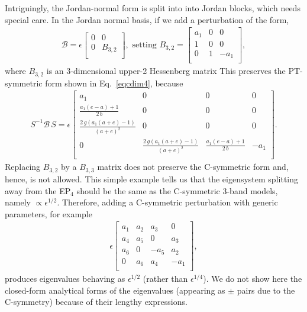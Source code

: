 \documentclass[aps, prl, onecolumn, nofootinbib, citeautoscript, nolongbibliography]{revtex4-2}
\begin{document}
Intriguingly, the Jordan-normal form is split into into Jordan blocks, which needs special care. In the Jordan normal basis, if we add a perturbation of the form, 
\begin{align}
\mathcal B = \epsilon \begin{bmatrix}
 0 & 0 \\
0  & B_{3,2}\\
\end{bmatrix}, \text{ setting }
B_{3,2} = \begin{bmatrix}
 a_1 & 0 & 0 \\
 1 & 0 & 0 \\
0 & 1 & -a_1 \\
 \end{bmatrix},
\end{align}
where $B_{3,2}$ is an $3$-dimensional upper-2 Hessenberg matrix
This preserves the PT-symmetric form shown in Eq.~\eqref{eqcdim4}, because
\begin{align}
S^{-1} {\mathcal B} \,S = \epsilon \begin{bmatrix}
  a_1 & 0 & 0 & 0 \\
 \frac{a_1 (e-a)+1} {2\, b} & 0 & 0 & 0 \\
 \frac{2 \,g \left(a_1 (a+e)-1\right)}{(a+e)^2} & 0 & 0 & 0 \\
 0 & \frac{2 \,g \left(a_1 (a+e)-1\right)}{(a+e)^2} & \frac{a_1 (e-a)+1}{2 \,b} & -a_1 \\
 \end{bmatrix}.
\end{align}
Replacing $B_{3,2}$ by a $B_{3,3}$ matrix does not preserve the C-symmetric form and, hence, is not allowed. This simple example tells us that the
eigensystem splitting away from the EP$_4$ should be the same as the C-symmetric 3-band models, namely $\propto \epsilon^{1/2}$.
Therefore, adding a C-symmetric perturbation with generic parameters, for example
\begin{align}
\epsilon \begin{bmatrix}
 a_1 & a_2 & a_3 & 0 \\
 a_4 & a_5 & 0 & a_3 \\
 a_6 & 0 & -a_5 & a_2 \\
 0 & a_6 & a_4 & -a_1 \\
\end{bmatrix},
\end{align}
produces eigenvalues behaving as $ \epsilon^{1/2} $ (rather than $\epsilon^{1/4}$). We do not show here the closed-form analytical forms of the eigenvalues (appearing as $\pm $ pairs due to the C-symmetry) because of their lengthy expressions.


\end{document}
